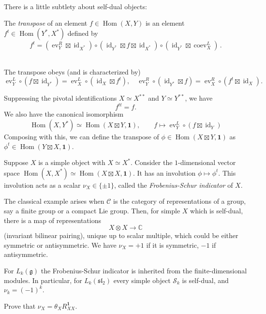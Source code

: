 \documentclass[12pt,letterpaper,reqno]{amsart}
\numberwithin{equation}{section}
\newcommand{\fg}{{\mathfrak g}}
\newcommand{\fsl}{{\mathfrak {sl}}}
\newcommand{\cC}{\ensuremath{\mathcal C}}
\newcommand{\cS}{\ensuremath{\mathcal S}}
\newcommand{\bbC}{\ensuremath{\mathbb C}}
\newcommand\bid{{\mathbf 1}}
\newcommand{\ti}[1]{\textit{#1}}
\DeclareMathOperator{\Hom}{Hom}
\DeclareMathOperator{\id}{id}
\DeclareMathOperator{\ev}{ev}
\DeclareMathOperator{\coev}{coev}
\DeclareRobustCommand{\fixme}[1]{\leavevmode{\color{orange}[#1]}}
\begin{document}
There is a little subtlety about self-dual objects:

\begin{defn}
The \ti{transpose} of an element $f \in \Hom(X,Y)$
is an element $f^t \in \Hom(Y^*, X^*)$ 
defined by
\[
f^t
=
(\ev_Y^R\boxtimes \id_{X^*})
\circ
(\id_{Y^*}\boxtimes f\boxtimes \id_{X^*})
\circ
(\id_{Y^*}\boxtimes \coev_X^L) \, .
\] \,
\end{defn}
The transpose obeys (and is characterized by)
\[
\ev_Y^L\circ(f\boxtimes \id_{Y^*})
=
\ev_X^L\circ(\id_X\boxtimes f^t), \quad \ev_Y^R\circ(\id_{Y^*}\boxtimes f)
=
\ev_X^R\circ(f^t\boxtimes \id_X).
\]


Suppressing the pivotal identifications $X\simeq X^{**}$ and $Y\simeq Y^{**}$, we have
\[
f^{tt}=f.
\]
We also have the canonical isomorphism
\[
\Hom(X,Y^*)  \simeq  \Hom(X\boxtimes Y,\bid),
\qquad
f \longmapsto \ev_Y^L \circ (f\boxtimes \id_Y)
\]
Composing with this, we can define the transpose of
$\phi \in \Hom(X \boxtimes Y, \bid)$ 
as
$\phi^t \in \Hom(Y \boxtimes X, \bid)$.

\begin{defn}
Suppose $X$ is a simple object with $X \simeq X^*$. 
Consider the $1$-dimensional vector space $\Hom(X,X^*) \simeq \Hom(X \boxtimes X, \bid)$.
It has an involution $\phi \mapsto \phi^t$.
This involution acts as a scalar $\nu_X \in \{ \pm 1 \}$, called
the \ti{Frobenius-Schur indicator} of $X$.
\end{defn}

\begin{example}
The classical example arises when $\cC$ is the category of 
representations of a group, say a finite group or a compact Lie group.
Then, for simple $X$ which is self-dual, there is a map of representations
\begin{equation}
  X \otimes X \to \bbC
\end{equation}
(invariant bilinear pairing), unique up to scalar multiple, 
which could be either symmetric or
antisymmetric. We have $\nu_X = +1 $ if it is symmetric,
$-1$ if antisymmetric.
\end{example}

\begin{example}
For $L_k(\fg)$ the Frobenius-Schur indicator is inherited from
the finite-dimensional modules. In particular,
for $L_k(\fsl_2)$ every simple object $\cS_k$ is self-dual,
and $\nu_k = (-1)^k$.
\end{example}

\begin{exercise}
Prove that $\nu_X = \theta_X R_{XX}^\bid$. \fixme{check sign}
\end{exercise}
\end{document}
